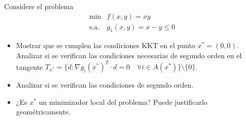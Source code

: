 \documentclass{article}
\newenvironment{theorem}[2][Ejercicio]{\begin{trivlist}
\item[\hskip \labelsep {\bfseries #1}\hskip \labelsep {\bfseries #2.}]}{\end{trivlist}}
\begin{document}
\begin{theorem}{11}
    Considere el problema
    \[
        \begin{array}{ll}
            \min        & f(x, y) = xy             \\
            \text{s.a.} & g_1(x, y) = x - y \leq 0
        \end{array}
    \]
    \begin{itemize}
        \item[(a)] Mostrar que se cumplen las condiciones KKT en el punto \( x^* = (0, 0) \). Analizar si se verifican las condiciones necesarias de segundo orden en el tangente \( T_{x^*} = \{ d : {\nabla g_i(x^*)}^T \cdot d = 0 \quad \forall i \in A(x^*) \} \setminus \{ 0 \} \).
        \item[(b)] Analizar si se verifican las condiciones de segundo orden.
        \item[(c)] ¿Es \( x^* \) un minimizador local del problema? Puede justificarlo geométricamente.
    \end{itemize}
\end{theorem}
\end{document}
